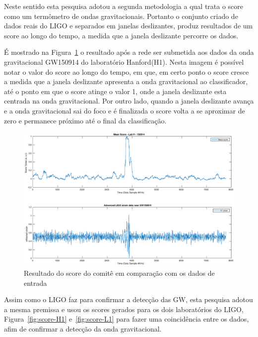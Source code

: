 Neste sentido esta pesquisa adotou a segunda metodologia a qual trata o score como um termômetro de ondas gravitacionais. Portanto o conjunto criado de dados reais do LIGO e separados em janelas deslizantes, produz resultados de um score ao longo do tempo, a medida que a janela deslizante percorre os dados.

É mostrado na Figura~\ref{fig:detection} o resultado após a rede ser submetida aos dados da onda gravitacional GW150914 do laboratório Hanford(H1). Nesta imagem é possível notar o valor do score ao longo do tempo, em que, em certo ponto o score cresce a medida que a janela deslizante apresenta a onda gravitacional ao classificador, até o ponto em que o score atinge o valor 1, onde a janela deslizante esta centrada na onda gravitacional. Por outro lado, quando a janela deslizante avança e a onda gravitacional sai do foco e é finalizada o score volta a se aproximar de zero e permanece próximo até o final da classificação.

\begin{figure}[H]
\centering
\includegraphics[width=1\textwidth]{figuras/detection.eps}
\caption{Resultado do score do comitê em comparação com os dados de entrada}
\label{fig:detection}
\end{figure}

Assim como o LIGO faz para confirmar a detecção das GW, esta pesquisa adotou a mesma premissa e usou os scores gerados para os dois laboratórios do LIGO, Figura~\ref{fig:score-H1} e~\ref{fig:score-L1} para fazer uma coincidência entre os dados, afim de confirmar a detecção da onda gravitacional.

